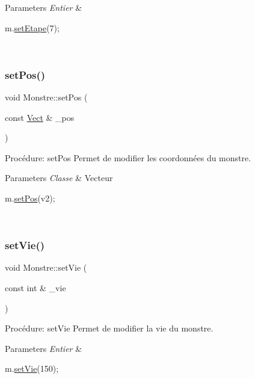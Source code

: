 \begin{DoxyParams}{Parameters}
{\em Entier} & 
\begin{DoxyCode}
m.\hyperlink{classMonstre_a51895539b2db4bd6e267e0ac5a1729ce}{setEtape}(7);
\end{DoxyCode}
 \\
\hline
\end{DoxyParams}
\mbox{\label{classMonstre_ac1ba6618f2a485ea20a448dbbddbf368}} 
\subsubsection{\texorpdfstring{set\+Pos()}{setPos()}}
{\footnotesize\ttfamily void Monstre\+::set\+Pos (\begin{DoxyParamCaption}\item[{const \hyperlink{classVect}{Vect} \&}]{\+\_\+pos }\end{DoxyParamCaption})}



Procédure\+: set\+Pos Permet de modifier les coordonnées du monstre. 


\begin{DoxyParams}{Parameters}
{\em Classe} & Vecteur 
\begin{DoxyCode}
m.\hyperlink{classMonstre_ac1ba6618f2a485ea20a448dbbddbf368}{setPos}(v2);
\end{DoxyCode}
 \\
\hline
\end{DoxyParams}
\mbox{\label{classMonstre_ad26a170300007ea8c78348a29123de5c}} 
\subsubsection{\texorpdfstring{set\+Vie()}{setVie()}}
{\footnotesize\ttfamily void Monstre\+::set\+Vie (\begin{DoxyParamCaption}\item[{const int \&}]{\+\_\+vie }\end{DoxyParamCaption})}



Procédure\+: set\+Vie Permet de modifier la vie du monstre. 


\begin{DoxyParams}{Parameters}
{\em Entier} & 
\begin{DoxyCode}
m.\hyperlink{classMonstre_ad26a170300007ea8c78348a29123de5c}{setVie}(150);
\end{DoxyCode}
 \\
\hline
\end{DoxyParams}
\mbox{\label{classMonstre_a900cdfe95acf91d17bcf8b33e2b59a97}} 
